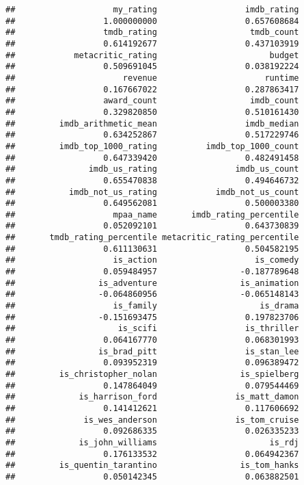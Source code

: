 \documentclass[
]{article}
\begin{document}
\begin{verbatim}
##                    my_rating                  imdb_rating 
##                  1.000000000                  0.657608684 
##                  tmdb_rating                   tmdb_count 
##                  0.614192677                  0.437103919 
##            metacritic_rating                       budget 
##                  0.509691045                  0.038192224 
##                      revenue                      runtime 
##                  0.167667022                  0.287863417 
##                  award_count                   imdb_count 
##                  0.329820850                  0.510161430 
##         imdb_arithmetic_mean                  imdb_median 
##                  0.634252867                  0.517229746 
##         imdb_top_1000_rating          imdb_top_1000_count 
##                  0.647339420                  0.482491458 
##               imdb_us_rating                imdb_us_count 
##                  0.655470838                  0.494646732 
##           imdb_not_us_rating            imdb_not_us_count 
##                  0.649562081                  0.500003380 
##                    mpaa_name       imdb_rating_percentile 
##                  0.052092101                  0.643730839 
##       tmdb_rating_percentile metacritic_rating_percentile 
##                  0.611130631                  0.504582195 
##                    is_action                    is_comedy 
##                  0.059484957                 -0.187789648 
##                 is_adventure                 is_animation 
##                 -0.064860956                 -0.065148143 
##                    is_family                     is_drama 
##                 -0.151693475                  0.197823706 
##                     is_scifi                  is_thriller 
##                  0.064167770                  0.068301993 
##                 is_brad_pitt                  is_stan_lee 
##                  0.093952319                  0.096389472 
##         is_christopher_nolan                 is_spielberg 
##                  0.147864049                  0.079544469 
##             is_harrison_ford                is_matt_damon 
##                  0.141412621                  0.117606692 
##              is_wes_anderson                is_tom_cruise 
##                  0.092686335                  0.026335233 
##             is_john_williams                       is_rdj 
##                  0.176133532                  0.064942367 
##         is_quentin_tarantino                 is_tom_hanks 
##                  0.050142345                  0.063882501 

\end{verbatim}
\end{document}
